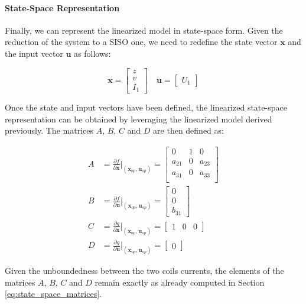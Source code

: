 \paragraph{State-Space Representation}

Finally, we can represent the linearized model in state-space form.
Given the reduction of the system to a SISO one, we need to redefine the state vector $\mathbf{x}$ and the input vector $\mathbf{u}$ as follows:

\begin{equation}
    \mathbf{x} = \begin{bmatrix}
        z \\
        v \\
        I_1
    \end{bmatrix}
    \quad
    \mathbf{u} = \begin{bmatrix}
        U_1
    \end{bmatrix}
\end{equation}


Once the state and input vectors have been defined, the linearized state-space representation can be obtained by leveraging the linearized model derived previously.
The matrices $A$, $B$, $C$ and $D$ are then defined as:

\begin{equation}
    \begin{aligned}
        A & = \frac{\partial f}{\partial \mathbf{x}} \Bigg|_{(\mathbf{x}_{op}, \mathbf{u}_{op})}
        = \begin{bmatrix}
              0      & 1 & 0      \\
              a_{21} & 0 & a_{23} \\
              a_{31} & 0 & a_{33} \\
          \end{bmatrix}                                                                    \\
        B & = \frac{\partial f}{\partial \mathbf{u}} \Bigg|_{(\mathbf{x}_{op}, \mathbf{u}_{op})}
        = \begin{bmatrix}
              0 \\
              0 \\
              b_{31}
          \end{bmatrix}                                                                         \\
        C & = \frac{\partial g}{\partial \mathbf{x}} \Bigg|_{(\mathbf{x}_{op}, \mathbf{u}_{op})}
        = \begin{bmatrix}
              1 & 0 & 0
          \end{bmatrix}                                                                         \\
        D & = \frac{\partial g}{\partial \mathbf{u}} \Bigg|_{(\mathbf{x}_{op}, \mathbf{u}_{op})}
        = \begin{bmatrix}
              0
          \end{bmatrix}
    \end{aligned}
\end{equation}

Given the unboundedness between the two coils currents, the elements of the matrices $A$, $B$, $C$ and $D$ remain exactly as already computed in Section \ref{eq:state_space_matrices}.